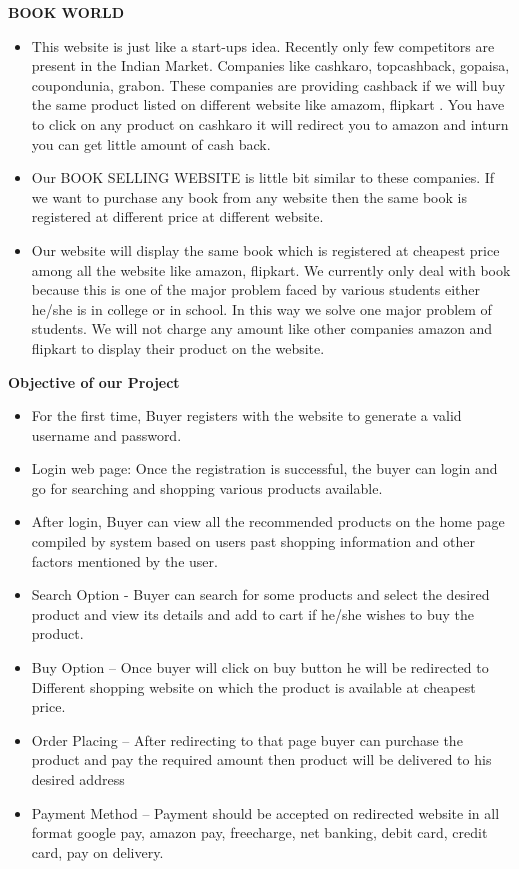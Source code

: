 \documentclass[12pt]{article}
\begin{document}
\newpage
{\Large\textbf{BOOK WORLD}}
\begin{itemize}
\item This website is just like a start-ups idea. Recently only few competitors are
present in the Indian Market. Companies like cashkaro, topcashback, gopaisa,
coupondunia, grabon. These companies are providing cashback if we will buy
the same product listed on different website like amazom, flipkart . You have
to click on any product on cashkaro it will redirect you to amazon and inturn
you can get little amount of cash back.
\item Our BOOK SELLING WEBSITE is little bit similar to these companies.
If we want to purchase any book from any website then the same book is registered at different price at different website.
\item  Our website will display the same
book which is registered at cheapest price among all the website like amazon,
flipkart. We currently only deal with book because this is one of the major problem faced by various students either he/she is in college or in school. In this way
we solve one major problem of students. We will not charge any amount like
other companies amazon and flipkart to display their product on the website.
\end{itemize}
\newpage
{\Large\textbf{Objective of our Project}}
	\begin{itemize}
	    
	 \item For the first time, Buyer registers with the website to generate a valid
username and password.
\item  Login web page: Once the registration is successful, the buyer can login
and go for searching and shopping various products available.
\item After login, Buyer can view all the recommended products on the home page compiled by system based on users past shopping information and
other factors mentioned by the user.
\item  Search Option - Buyer can search for some products and select the desired
product and view its details and add to cart if he/she wishes to buy the
product.
\item  Buy Option – Once buyer will click on buy button he will be redirected to
Different shopping website on which the product is available at cheapest
price.
\item  Order Placing – After redirecting to that page buyer can purchase the
product and pay the required amount then product will be delivered to
his desired address
\item  Payment Method – Payment should be accepted on redirected website in
all format google pay, amazon pay, freecharge, net banking, debit card,
credit card, pay on delivery.

	\end{itemize}
\end{document}
